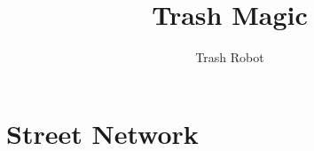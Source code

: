 \documentclass[ebook,12pt,openany,onesided]{memoir} %
\title{Trash Magic}
\author{Trash Robot}
\begin{document}
\frontmatter

\clearpage

\clearpage

\newpage
\thispagestyle{empty}
\mbox{}

\maketitle



%

\mainmatter

\chapter{Street Network}




\end{document}
